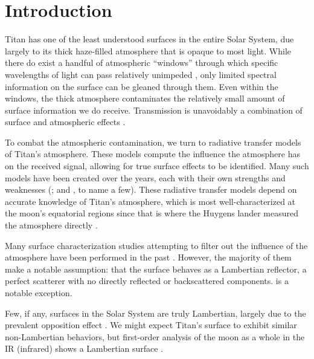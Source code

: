\documentclass[twocolumn,linenumbers]{aastex631}
\begin{document}

\section{Introduction} \label{sec:intro}

Titan has one of the least understood surfaces in the entire Solar System, due largely to its thick haze-filled atmosphere that is opaque to most light. While there do exist a handful of atmospheric ``windows'' through which specific wavelengths of light can pass relatively unimpeded \citep{Barnes2007}, only limited spectral information on the surface can be gleaned through them. Even within the windows, the thick atmosphere contaminates the relatively small amount of surface information we do receive. Transmission is unavoidably a combination of surface and atmospheric effects \citep{EsSayeh2023}.

To combat the atmospheric contamination, we turn to radiative transfer models of Titan's atmosphere. These models compute the influence the atmosphere has on the received signal, allowing for true surface effects to be identified. Many such models have been created over the years, each with their own strengths and weaknesses (\cite{Vinatier2007, Griffith2012, Xu2013, Barnes2018a, Rodriguez2018, Corlies2021, Rannou2021}; and \cite{EsSayeh2023}, to name a few). These radiative transfer models depend on accurate knowledge of Titan's atmosphere, which is most well-characterized at the moon's equatorial regions since that is where the Huygens lander measured the atmosphere directly \citep{Tomasko2008}.

Many surface characterization studies attempting to filter out the influence of the atmosphere have been performed in the past \citep{McCord2006, Buratti2006, Soderblom2009, Kazeminejad2011, Bonnefoy2016, Brossier2018, EsSayeh2023, Solomonidou2024}. However, the majority of them make a notable assumption: that the surface behaves as a Lambertian reflector, a perfect scatterer with no directly reflected or backscattered components. \cite{Buratti2006} is a notable exception.

Few, if any, surfaces in the Solar System are truly Lambertian, largely due to the prevalent opposition effect \citep{Deau2009, Schroder2009}. We might expect Titan's surface to exhibit similar non-Lambertian behaviors, but first-order analysis of the moon as a whole in the IR (infrared) shows a Lambertian surface \citep{LeMoulic2019, LeMoulic2012}.
\end{document}
